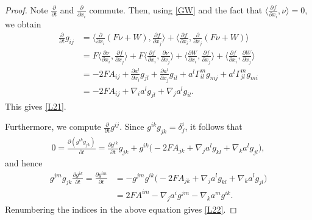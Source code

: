 \documentclass{amsart}
\theoremstyle{definition}
\numberwithin{equation}{section}
\begin{document}
\begin{proof}


Note $\frac{\partial}{\partial t}$ and
$\frac{\partial}{\partial x_i}$  commute. Then,  using \eqref{GW}  and  the fact that $\langle
\frac{\partial f}{\partial x_i}, \nu \rangle =0 $, we obtain
\begin{align}
\frac{\partial}{\partial t}g_{ij}
&=\langle \frac{\partial }{\partial x_i}(F\nu+W),
\frac{\partial f}{\partial x_j}\rangle+\langle \frac{\partial f
}{\partial x_i},
\frac{\partial }{\partial x_j}(F\nu+W)\rangle\nonumber\\
&= F\langle \frac{\partial \nu }{\partial x_i},
\frac{\partial f}{\partial x_j}\rangle + F \langle  \frac{\partial f }{\partial x_i},
\frac{\partial \nu}{\partial x_j}\rangle +\langle \frac{\partial W}{\partial x_i},
\frac{\partial f}{\partial x_j}\rangle+\langle \frac{\partial
f}{\partial x_i}, \frac{\partial W}{\partial x_j}\rangle\nonumber\\
&=-2F A_{ij}+\frac{\partial a^l}{\partial
x_i}g_{jl}+\frac{\partial a^l}{\partial
x_j}g_{il}+a^l\Gamma_{il}^mg_{mj}+a^l\Gamma_{jl}^mg_{mi}\nonumber\\
&=-2F A_{ij}+\nabla_i a^l g_{jl}+\nabla_j a^lg_{il}.\nonumber
\end{align}
This gives \eqref{L21}.

Furthermore, we compute $\frac{\partial}{\partial t}g^{ij}$. Since
$g^{ik}g_{jk}=\delta^i_j$, it follows that
\begin{align}
0=\frac{\partial (g^{ik}g_{jk})}{\partial t}=\frac{\partial
g^{ik}}{\partial t}g_{jk}+g^{ik}\big(-2F A_{jk}+\nabla_j a^l
g_{kl}+\nabla_k a^lg_{jl} \big),\nonumber
\end{align}
and hence
\begin{align}
g^{jm}g_{jk}\frac{\partial g^{ik}}{\partial t}=\frac{\partial
g^{im}}{\partial t}&=-g^{jm}g^{ik}\big(-2F A_{jk}+\nabla_j a^l
g_{kl}+\nabla_k a^lg_{jl} \big)\nonumber\\
&=2F A^{im}-\nabla_j a^i g^{jm}-\nabla_k a^m g^{ik}. \nonumber
\end{align}
Renumbering the indices in the above equation gives \eqref{L22}.


\end{proof}
\end{document}
